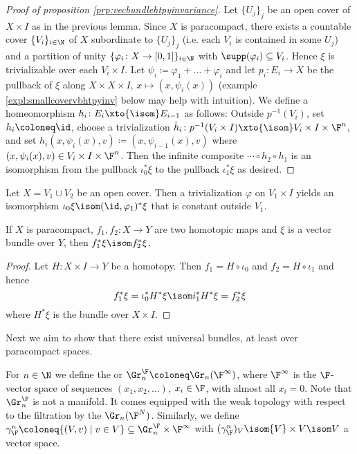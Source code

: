 \begin{proof}[Proof of proposition \ref{prp:vecbundlehtpyinvariance}]
	Let $\{U_j\}_j$ be an open cover of $X \times I$ as in the previous lemma.
	Since $X$ is paracompact, there exists a countable cover $\{V_i\}_{i \in \N}$ of $X$ subordinate to $\{U_j\}_j$ (i.e. each $V_i$ is contained in some $U_j$) and a partition of unity $\{\varphi_i\colon X \to [0, 1]\}_{i \in \N}$ with $\supp(\varphi_i) \subseteq V_i$.
	Hence $\xi$ is trivializable over each $V_i \times I$.
	Let $\psi_i \coloneq \varphi_1 + \ldots + \varphi_i$ and let $p_i\colon E_i \to X$ be the pullback of $\xi$ along $X \times X \times I$, $x \mapsto (x, \psi_i(x))$ (example \ref{expl:smallcovervbhtpyinv} below may help with intuition).
	We define a homeomorphism $h_i\colon E_i \xto{\isom} E_{i - 1}$ as follows:
	Outside $p^{-1}(V_i)$, set $h_i \coloneq \id$, choose a trivialization $\tilde{h}_i\colon p^{-1}(V_i \times I) \xto{\isom} V_i \times I \times \F^n$, and set $h_i(x, \psi_i(x), v) \coloneq (x, \psi_{i - 1}(x), v)$ where $(x, \psi_i(x), v) \in V_i \times I \times \F^n$.
	Then the infinite composite $\cdots \circ h_2 \circ h_1$ is an isomorphism from the pullback $\iota_0^* \xi$ to the pullback $\iota_1^* \xi$ as desired.
\end{proof}
\begin{example}\label{expl:smallcovervbhtpyinv}
	Let $X = V_1 \cup V_2$ be an open cover.
	Then a trivialization $\varphi$ on $V_1 \times I$ yields an isomorphism $\iota_0 \xi \isom (\id, \varphi_1)^* \xi$ that is constant outside $V_1$.
\end{example}
\begin{corollary}
	If $X$ is paracompact, $f_1, f_2\colon X \to Y$ are two homotopic maps and $\xi$ is a vector bundle over $Y$, then $f_1^* \xi \isom f_2^* \xi$.
\end{corollary}
\begin{proof}
	Let $H\colon X \times I \to Y$ be a homotopy.
	Then $f_1 = H \circ \iota_0$ and $f_2 = H \circ \iota_1$ and hence
	\begin{equation*}
		f_1^* \xi = \iota_0^* H^* \xi \isom i_1^* H^* \xi = f_2^* \xi
	\end{equation*}
	where $H^* \xi$ is the bundle over $X \times I$.
\end{proof}
Next we aim to show that there exist universal bundles, at least over paracompact spaces.
\begin{definition}
	For $n \in \N$ we define the  or  $\Gr_n^{\F} \coloneq \Gr_n(\F^\infty)$, where $\F^\infty$ is the $\F$-vector space of sequences $(x_1, x_2, \ldots)$, $x_i \in \F$, with almost all $x_i = 0$.
	Note that $\Gr_n^{\F}$ is not a manifold.
	It comes equipped with the weak topology with respect to the filtration by the $\Gr_n(\F^N)$.
	Similarly, we define $\gamma_{\F}^n \coloneq \{(V, v) \mid v \in V\} \subseteq \Gr_n^{\F} \times \F^\infty$ with $(\gamma_{\F}^n)_V \isom \{V\} \times V \isom V$ a vector space.
\end{definition}
